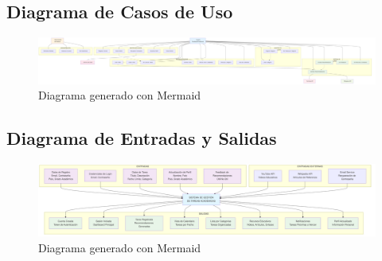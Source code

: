 \documentclass{pretexto/report}
\begin{document}
\begin{landscape}

\subsection{Diagrama de Casos de Uso}
\begin{figure}[H]
    \centering
    \includegraphics[width=\linewidth]{pngs/use_cases.png}
    \caption{Diagrama generado con Mermaid}
\end{figure}

\subsection{Diagrama de Entradas y Salidas}
\begin{figure}[H]
    \centering
    \includegraphics[width=\linewidth]{pngs/e_s.png}
    \caption{Diagrama generado con Mermaid}
\end{figure}

\end{landscape}




\pagebreak
\printbibliography[heading=bibintoc]
\end{document}
